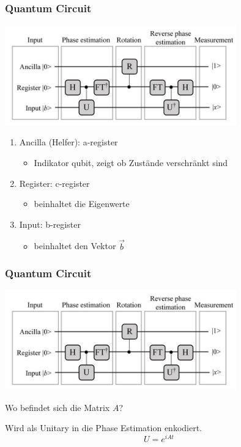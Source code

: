     \begin{frame}
    \frametitle{Quantum Circuit}
    \begin{center}
    \includegraphics[width=10cm]{img/hhl_circuit.jpg}
    \end{center}

    \begin{enumerate}
        \item Ancilla (Helfer): a-register
        \begin{itemize}
            \item Indikator qubit, zeigt ob Zustände verschränkt sind
        \end{itemize}

        \item Register: c-register
        \begin{itemize}
            \item beinhaltet die Eigenwerte
        \end{itemize}
        
        \item Input: b-register 
        \begin{itemize}
            \item beinhaltet den Vektor $\vec{b}$
        \end{itemize}
        
    \end{enumerate}
   \end{frame}

\begin{frame}
    \frametitle{Quantum Circuit}
    \begin{center}
    \includegraphics[width=10cm]{img/hhl_circuit.jpg}
    \end{center}

    \hfil

    Wo befindet sich die Matrix $A$?

    \hfil

    Wird als Unitary in die Phase Estimation enkodiert.
    $$U = e^{iAt}$$
\end{frame}

